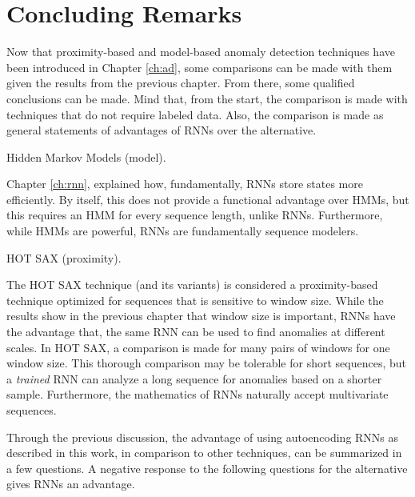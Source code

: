 \chapter{Concluding Remarks}

Now that proximity-based and model-based anomaly detection techniques have been introduced in Chapter \ref{ch:ad}, some comparisons can be made with them given the results from the previous chapter.
%
From there, some qualified conclusions can be made.
%
Mind that, from the start, the comparison is made with techniques that do not require labeled data.
%
Also, the comparison is made as general statements of advantages of RNNs over the alternative.

\begin{description}


\item Hidden Markov Models (model).

      Chapter \ref{ch:rnn}, explained how, fundamentally, RNNs store states more efficiently.
      By itself, this does not provide a functional advantage over HMMs, but this requires an HMM for every sequence length, unlike RNNs.
      Furthermore, while HMMs are powerful, RNNs are fundamentally sequence modelers.


\item HOT SAX (proximity).

      The HOT SAX \cite{Keogh2005} technique (and its variants) is considered a proximity-based technique optimized for sequences that is sensitive to window size.
      While the results show in the previous chapter that window size is important, RNNs have the advantage that, the same RNN can be used to find anomalies at different scales.
      In HOT SAX, a comparison is made for many pairs of windows for one window size.
      This thorough comparison may be tolerable for short sequences, but a \emph{trained} RNN can analyze a long sequence for anomalies based on a shorter sample.
      Furthermore, the mathematics of RNNs naturally accept multivariate sequences.


\end{description}


Through the previous discussion, the advantage of using autoencoding RNNs as described in this work, in comparison to other techniques, can be summarized in a few questions.
%
A negative response to the following questions for the alternative gives RNNs an advantage.

